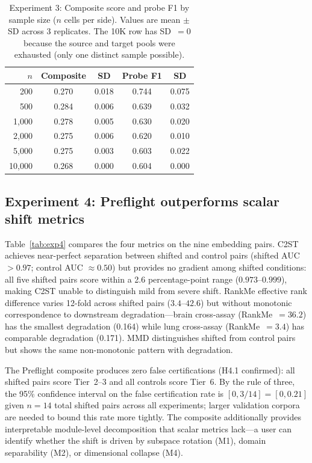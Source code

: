 \documentclass[11pt,letterpaper]{article}
\begin{document}
\begin{table}[t]
\centering
\caption{Experiment 3: Composite score and probe F1 by sample size ($n$ cells per side). Values are mean $\pm$ SD across 3 replicates. The 10K row has SD~$= 0$ because the source and target pools were exhausted (only one distinct sample possible).}
\label{tab:exp3}
\small
\begin{tabular}{@{}rcccc@{}}
\toprule
$n$ & Composite & SD & Probe F1 & SD \\
\midrule
200    & 0.270 & 0.018 & 0.744 & 0.075 \\
500    & 0.284 & 0.006 & 0.639 & 0.032 \\
1,000  & 0.278 & 0.005 & 0.630 & 0.020 \\
2,000  & 0.275 & 0.006 & 0.620 & 0.010 \\
5,000  & 0.275 & 0.003 & 0.603 & 0.022 \\
10,000 & 0.268 & 0.000 & 0.604 & 0.000 \\
\bottomrule
\end{tabular}
\end{table}

\subsection{Experiment 4: Preflight outperforms scalar shift metrics}

Table~\ref{tab:exp4} compares the four metrics on the nine embedding pairs. C2ST achieves near-perfect separation between shifted and control pairs (shifted AUC $> 0.97$; control AUC $\approx 0.50$) but provides no gradient among shifted conditions: all five shifted pairs score within a 2.6 percentage-point range ($0.973$--$0.999$), making C2ST unable to distinguish mild from severe shift. RankMe effective rank difference varies 12-fold across shifted pairs ($3.4$--$42.6$) but without monotonic correspondence to downstream degradation---brain cross-assay (RankMe~$= 36.2$) has the smallest degradation (0.164) while lung cross-assay (RankMe~$= 3.4$) has comparable degradation (0.171). MMD distinguishes shifted from control pairs but shows the same non-monotonic pattern with degradation.

The Preflight composite produces zero false certifications (H4.1 confirmed): all shifted pairs score Tier~2--3 and all controls score Tier~6. By the rule of three, the 95\% confidence interval on the false certification rate is $[0, 3/14] = [0, 0.21]$ given $n = 14$ total shifted pairs across all experiments; larger validation corpora are needed to bound this rate more tightly. The composite additionally provides interpretable module-level decomposition that scalar metrics lack---a user can identify whether the shift is driven by subspace rotation (M1), domain separability (M2), or dimensional collapse (M4).
\end{document}
